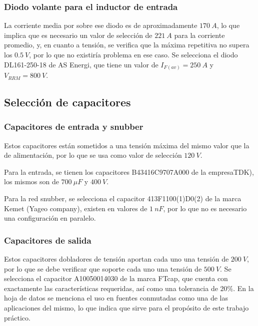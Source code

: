 \subsubsection{Diodo volante para el inductor de entrada}

La corriente media por sobre ese diodo es de aproximadamente $170 \ A$, lo que implica que es necesario un valor de selección de $221 \ A$ para la corriente promedio, y, en cuanto a tensión, se verifica que la máxima repetitiva no supera los $0.5 \ V$, por lo que no existiría problema en ese caso. Se selecciona el diodo DL161-250-18 de AS Energi, que tiene un valor de $I_{F(av)} = 250 \ A$ y $V_{RRM}=800 \ V$.
\subsection{Selección de capacitores}

\subsubsection{Capacitores de entrada y snubber}

Estos capacitores están sometidos a una tensión máxima del mismo valor que la de alimentación, por lo que se usa como valor de selección $120 \ V$. 

Para la entrada, se tienen los capacitores B43416C9707A000 de la empresaTDK), los mismos son de $700 \ \mu F$ y $400 \ V$.

Para la red snubber, se selecciona el capacitor 413F1100(1)D0(2)  de la marca Kemet (Yageo company), existen en valores de $1 \ nF$, por lo que no es necesario una configuración en paralelo.

\subsubsection{Capacitores de salida}

Estos capacitores dobladores de tensión aportan cada uno una tensión de $200 \ V$, por lo que se debe verificar que soporte cada uno una tensión de $500 \ V$. Se selecciona el capacitor A10050014030 de la marca FTcap, que cuenta con exactamente las características  requeridas, así como una tolerancia de $20\%$. En la hoja de datos se menciona el uso en fuentes conmutadas como una de las aplicaciones del mismo, lo que indica que sirve para el propósito de este trabajo práctico. 





\clearpage


